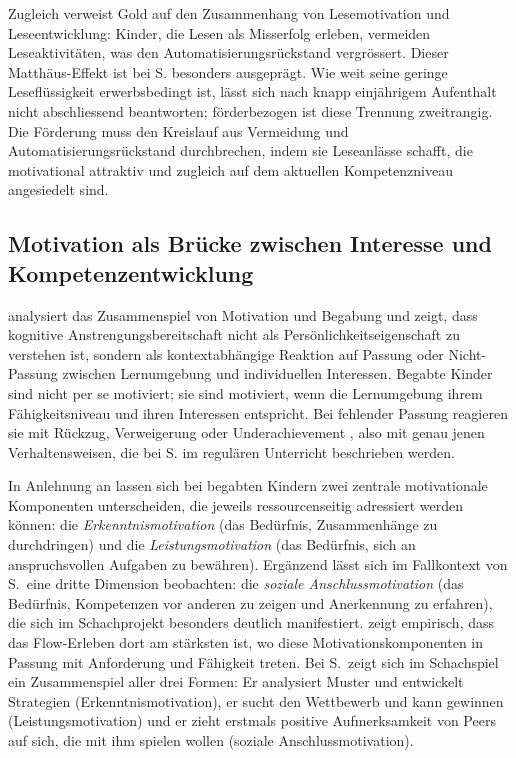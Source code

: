 \documentclass[ngerman, a4paper]{article}
\begin{document}
Zugleich verweist Gold auf den Zusammenhang von Lesemotivation und Leseentwicklung:
Kinder, die Lesen als Misserfolg erleben, vermeiden Leseaktivitäten, was den
Automatisierungsrückstand vergrössert. Dieser Matthäus-Effekt ist bei S. besonders ausgeprägt.
Wie weit seine geringe Leseflüssigkeit erwerbsbedingt ist, lässt sich nach knapp
einjährigem Aufenthalt nicht abschliessend beantworten; förderbezogen ist diese
Trennung zweitrangig. Die Förderung muss den Kreislauf aus Vermeidung und
Automatisierungsrückstand durchbrechen, indem sie Leseanlässe schafft, die
motivational attraktiv und zugleich auf dem aktuellen Kompetenzniveau angesiedelt sind.

\subsection{Motivation als Brücke zwischen Interesse und Kompetenzentwicklung}

\textcite[S.\,84--89]{lehwald2017motivation} analysiert das Zusammenspiel von
Motivation und Begabung und zeigt, dass
kognitive Anstrengungsbereitschaft nicht als Persönlichkeitseigenschaft zu verstehen ist,
sondern als kontextabhängige Reaktion auf Passung oder Nicht-Passung zwischen
Lernumgebung und individuellen Interessen. Begabte Kinder sind nicht per se motiviert;
sie sind motiviert, wenn die Lernumgebung ihrem Fähigkeitsniveau und ihren Interessen
entspricht. Bei fehlender Passung reagieren sie mit Rückzug, Verweigerung oder
Underachievement \parencite[S.\,546\,f.]{greiten2021underachievement}, also mit
genau jenen Verhaltensweisen, die bei S. im regulären
Unterricht beschrieben werden.

In Anlehnung an \textcite{lehwald2017motivation} lassen sich bei begabten
Kindern zwei zentrale motivationale Komponenten unterscheiden, die jeweils
ressourcenseitig adressiert werden können:
die \textit{Erkenntnismotivation} (das Bedürfnis, Zusammenhänge zu
durchdringen) und die \textit{Leistungsmotivation} (das Bedürfnis, sich an
anspruchsvollen Aufgaben zu bewähren). Ergänzend lässt sich im Fallkontext
von S.\ eine dritte Dimension beobachten: die \textit{soziale
  Anschlussmotivation} (das Bedürfnis, Kompetenzen vor anderen zu zeigen und
Anerkennung zu erfahren), die sich im Schachprojekt besonders deutlich
manifestiert. \textcite[S.\,84--89]{lehwald2017motivation}
zeigt empirisch, dass das Flow-Erleben dort am stärksten ist, wo diese
Motivationskomponenten in Passung mit Anforderung und Fähigkeit treten.
Bei S.\ zeigt sich im Schachspiel ein Zusammenspiel aller drei Formen:
Er analysiert Muster und entwickelt Strategien (Erkenntnismotivation),
er sucht den Wettbewerb und kann gewinnen (Leistungsmotivation) und er
zieht erstmals positive Aufmerksamkeit von Peers auf sich, die mit ihm
spielen wollen (soziale Anschlussmotivation).
\end{document}
